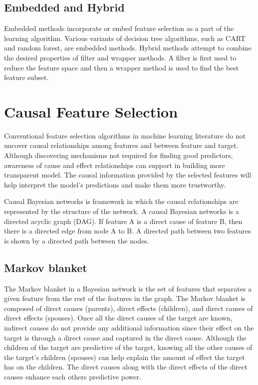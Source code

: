 \subsection{Embedded and Hybrid}
Embedded methods incorporate or embed feature selection as a part of the learning algorithm. Various variants of decision tree algorithms, such as CART and random forest, are embedded methods. Hybrid methods attempt to combine the desired properties of filter and wrapper methods. A filter is first used to reduce the feature space and then a wrapper method is used to find the best feature subset.  

\section{Causal Feature Selection}
\indent Conventional feature selection algorithms in machine learning literature do not uncover causal relationships among features and between feature and target. Although discovering mechanisms not required for finding good predictors, awareness of cause and effect relationships can support in building more transparent model. The causal information provided by the selected features will help interpret the model’s predictions and make them more trustworthy. 

\indent Causal Bayesian networks is framework in which the causal relationships are represented by the structure of the network. A causal Bayesian networks is a directed acyclic graph (DAG). If feature A is a direct cause of feature B, then there is a directed edge from node A to B. A directed path between two features is shown by a directed path between the nodes. 

\subsection{Markov blanket}
\indent The Markov blanket in a Bayesian network is the set of features that separates a given feature from the rest of the features in the graph. The Markov blanket is composed of direct causes (parents), direct effects (children), and direct causes of direct effects (spouses). Once all the direct causes of the target are known, indirect causes do not provide any additional information since their effect on the target is through a direct cause and captured in the direct cause. Although the children of the target are predictive of the target, knowing all the other causes of the target’s children (spouses) can help explain the amount of effect the target has on the children. The direct causes along with the direct effects of the direct causes enhance each others predictive power. 

